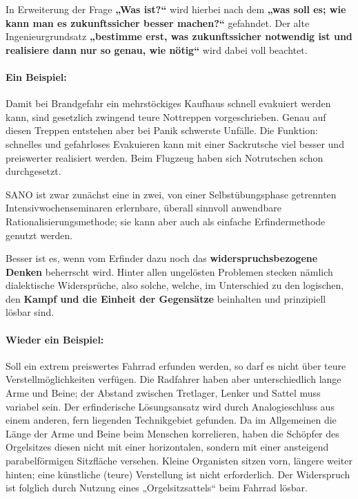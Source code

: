\documentclass[11pt,a4paper]{article}
\begin{document}
In Erweiterung der Frage \textbf{„Was ist?“} wird hierbei nach dem
\textbf{„was soll es; wie kann man es zukunftssicher besser machen?“}
gefahndet.  Der alte Ingenieurgrundsatz \textbf{„bestimme erst, was
  zukunftssicher notwendig ist und realisiere dann nur so genau, wie nötig“}
wird dabei voll beachtet.

\paragraph{Ein Beispiel:}
Damit bei Brandgefahr ein mehrstöckiges Kaufhaus schnell evakuiert werden
kann, sind gesetzlich zwingend teure Nottreppen vorgeschrieben.  Genau auf
diesen Treppen entstehen aber bei Panik schwerste Unfälle. Die Funktion:
schnelles und gefahrloses Evakuieren kann mit einer Sackrutsche viel besser
und preiswerter realisiert werden.  Beim Flugzeug haben sich Notrutschen schon
durchgesetzt.

SANO ist zwar zunächst eine in zwei, von einer Selbstübungsphase getrennten
Intensivwochenseminaren erlernbare, überall sinnvoll anwendbare
Rationalisierungsmethode; sie kann aber auch als einfache Erfindermethode
genutzt werden.

Besser ist es, wenn vom Erfinder dazu noch das \textbf{widerspruchsbezogene
  Denken} beherrscht wird.  Hinter allen ungelösten Problemen stecken nämlich
dialektische Widersprüche, also solche, welche, im Unterschied zu den
logischen, den \textbf{Kampf und die Einheit der Gegensätze} beinhalten und
prinzipiell lösbar sind.

\paragraph{Wieder ein Beispiel:}
Soll ein extrem preiswertes Fahrrad erfunden werden, so darf es nicht über
teure Verstellmöglichkeiten verfügen.  Die Radfahrer haben aber
unterschiedlich lange Arme und Beine; der Abstand zwischen Tretlager, Lenker
und Sattel muss variabel sein. Der erfinderische Lösungsansatz wird durch
Analogieschluss aus einem anderen, fern liegenden Technikgebiet gefunden.  Da
im Allgemeinen die Länge der Arme und Beine beim Menschen korrelieren, haben
die Schöpfer des Orgelsitzes diesen nicht mit einer horizontalen, sondern mit
einer ansteigend parabelförmigen Sitzfläche versehen.  Kleine Organisten
sitzen vorn, längere weiter hinten; eine künstliche (teure) Verstellung ist
nicht erforderlich. Der Widerspruch ist folglich durch Nutzung eines
„Orgelsitzsattels“ beim Fahrrad lösbar.
\end{document}
